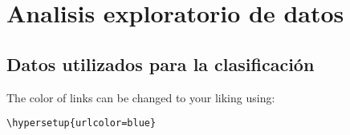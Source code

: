 
\chapter{Analisis exploratorio de datos} %

\label{AppendixA} %

\section{Datos utilizados para la clasificación}

The color of links can be changed to your liking using:

{\small\verb!\hypersetup{urlcolor=blue}!}
